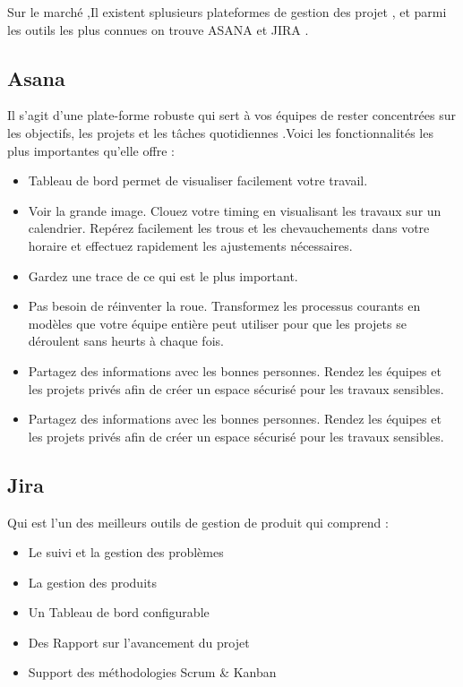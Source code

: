 Sur le march\'{e} ,Il existent splusieurs plateformes de gestion des projet , et parmi
les outils les plus connues on trouve ASANA et JIRA .

\subsection{Asana}

Il s'agit d'une plate-forme robuste qui sert \`{a} vos \'{e}quipes de rester concentr\'{e}es
sur les objectifs, les projets et les t\^{a}ches quotidiennes .Voici les
fonctionnalit\'{e}s les plus importantes qu'elle offre :


\begin{itemize}
\item{Tableau de bord permet de visualiser facilement votre travail.}

\item{ Voir la grande image. Clouez votre timing en visualisant les travaux sur
un calendrier. Rep\'{e}rez facilement les trous et les chevauchements dans
votre horaire et effectuez rapidement les ajustements n\'{e}cessaires.}

\item{Gardez une trace de ce qui est le plus important.}

\item{Pas besoin de r\'{e}inventer la roue. Transformez les processus courants en
mod\`{e}les que votre \'{e}quipe enti\`{e}re peut utiliser pour que les projets se
d\'{e}roulent sans heurts \`{a} chaque fois.}

\item{Partagez des informations avec les bonnes personnes. Rendez les
\'{e}quipes et les projets priv\'{e}s afin de cr\'{e}er un espace s\'{e}curis\'{e} pour les
travaux sensibles.}

\item{Partagez des informations avec les bonnes personnes. Rendez les
\'{e}quipes et les projets priv\'{e}s afin de cr\'{e}er un espace s\'{e}curis\'{e} pour les
travaux sensibles.}

\end{itemize}

\subsection{Jira}
Qui est l'un des meilleurs outils de gestion de produit qui comprend :
\begin{itemize}

\item{Le suivi et la gestion des probl\`{e}mes}

\item{La gestion des produits}

\item{Un Tableau de bord configurable}

\item{Des Rapport sur l'avancement du projet}

\item{Support des m\'{e}thodologies Scrum \& Kanban}

\end{itemize}



